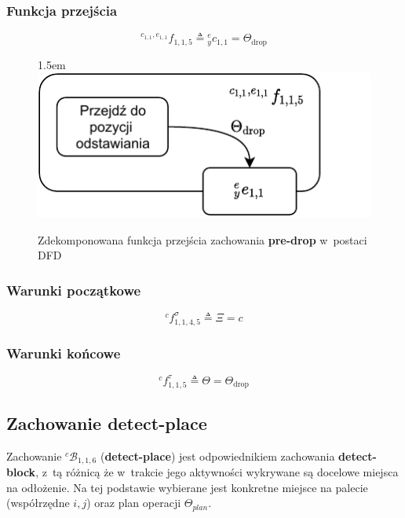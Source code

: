 \subsubsection{Funkcja przejścia}
\begin{equation}
    {}^{c_{1,1}, e_{1,1}}f_{1,1,5} \triangleq {}^{e}_{y}c_{1,1} = \Theta_{\mathrm{drop}}
\end{equation}

\begin{figure}[ht]
    \leftskip1.5em
    \includegraphics[width=\columnwidth]{figures/ISR-cs-fp-pre-drop.pdf}
    \caption{Zdekomponowana funkcja przejścia zachowania \textbf{pre-drop} w~postaci DFD}
    \label{fig:cs-fp-pre-drop}
\end{figure}

\subsubsection{Warunki początkowe}
\begin{equation}
    {}^{c}f^{\sigma}_{1,1,4,5} \triangleq \Xi = c
\end{equation}

\subsubsection{Warunki końcowe}
\begin{equation}
    {}^{c}f^{\tau}_{1,1,5} \triangleq \Theta = \Theta_{\mathrm{drop}}
\end{equation}


\subsection{Zachowanie detect-place}
\label{subsec:cs-detect-place}
Zachowanie ${}^{c}\mathcal{B}_{1,1,6}$ (\textbf{detect-place}) jest odpowiednikiem zachowania \textbf{detect-block}, z~tą różnicą że w~trakcie jego aktywności wykrywane są docelowe miejsca na odłożenie. Na tej podstawie wybierane jest konkretne miejsce na palecie (współrzędne $i,j$) oraz plan operacji $\Theta_{plan}$.

